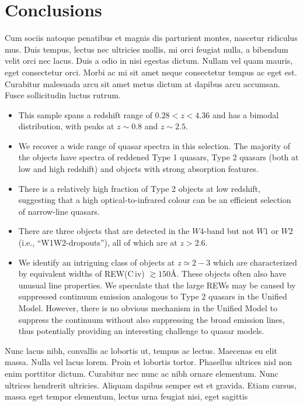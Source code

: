 \documentclass[usenatbib]{mn2e}
\begin{document}
\section{Conclusions}
\label{sec:conclusions}

Cum sociis natoque penatibus et magnis dis parturient montes, nascetur
ridiculus mus. Duis tempus, lectus nec ultricies mollis, mi orci
feugiat nulla, a bibendum velit orci nec lacus. Duis a odio in nisi
egestas dictum. Nullam vel quam mauris, eget consectetur orci. Morbi
ac mi sit amet neque consectetur tempus ac eget est. Curabitur
malesuada arcu sit amet metus dictum at dapibus arcu accumsan. Fusce
sollicitudin luctus rutrum.

\begin{itemize}
    \item{This sample spans a redshift range of $0.28 < z < 4.36$ and has a bimodal distribution, with peaks 
        at $z\sim0.8$ and $z\sim2.5$.}
   \item{We recover a wide range of quasar spectra in this selection.  
        The majority of the objects have spectra of reddened Type 1
        quasars, Type 2 quasars (both at low and high redshift) and objects
        with strong absorption features.} 
    \item{There is a relatively high fraction of Type 2 objects at low redshift,
        suggesting that a high optical-to-infrared colour can be an efficient
        selection of narrow-line quasars.}
    \item{There are three objects that are detected in the $W4$-band but
        not $W1$ or $W2$ (i.e., ``W1W2-dropouts''), all of which are at
        $z>2.6$.}
    \item{We identify an intriguing class of objects at $z\simeq 2-3$ which are
        characterized by equivalent widths of REW(C\,{\sc iv})
        $\gtrsim150$\AA.  These objects often also have unusual line
        properties.  We speculate that the large REWs may be caused by
        suppressed continuum emission analogous to Type 2 quasars in the
        Unified Model. However, there is no obvious mechanism in the Unified
        Model to suppress the continuum without also suppressing the broad
        emission lines, thus potentially providing an interesting challenge to
        quasar models.} 
\end{itemize}


Nunc lacus nibh, convallis ac lobortis ut, tempus ac lectus. Maecenas
eu elit massa. Nulla vel lacus lorem. Proin et lobortis
tortor. Phasellus ultrices nisl non enim porttitor dictum. Curabitur
nec nunc ac nibh ornare elementum. Nunc ultrices hendrerit
ultricies. Aliquam dapibus semper est et gravida. Etiam cursus, massa
eget tempor elementum, lectus urna feugiat nisi, eget sagittis








%


\end{document}

